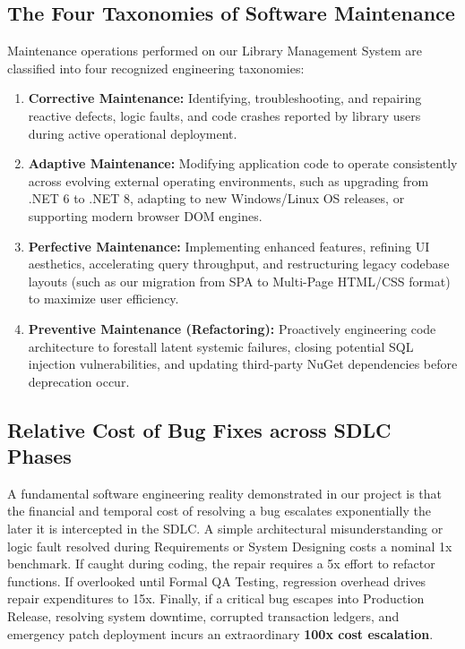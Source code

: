 \documentclass[10pt,journal,compsoc]{IEEEtran}
\begin{document}
\subsection{The Four Taxonomies of Software Maintenance}
Maintenance operations performed on our Library Management System are classified into four recognized engineering taxonomies:
\begin{enumerate}[leftmargin=1.5em]
    \item \textbf{Corrective Maintenance:} Identifying, troubleshooting, and repairing reactive defects, logic faults, and code crashes reported by library users during active operational deployment.
    \item \textbf{Adaptive Maintenance:} Modifying application code to operate consistently across evolving external operating environments, such as upgrading from .NET 6 to .NET 8, adapting to new Windows/Linux OS releases, or supporting modern browser DOM engines.
    \item \textbf{Perfective Maintenance:} Implementing enhanced features, refining UI aesthetics, accelerating query throughput, and restructuring legacy codebase layouts (such as our migration from SPA to Multi-Page HTML/CSS format) to maximize user efficiency.
    \item \textbf{Preventive Maintenance (Refactoring):} Proactively engineering code architecture to forestall latent systemic failures, closing potential SQL injection vulnerabilities, and updating third-party NuGet dependencies before deprecation occur.
\end{enumerate}

\subsection{Relative Cost of Bug Fixes across SDLC Phases}
A fundamental software engineering reality demonstrated in our project is that the financial and temporal cost of resolving a bug escalates exponentially the later it is intercepted in the SDLC. A simple architectural misunderstanding or logic fault resolved during Requirements or System Designing costs a nominal 1x benchmark. If caught during coding, the repair requires a 5x effort to refactor functions. If overlooked until Formal QA Testing, regression overhead drives repair expenditures to 15x. Finally, if a critical bug escapes into Production Release, resolving system downtime, corrupted transaction ledgers, and emergency patch deployment incurs an extraordinary \textbf{100x cost escalation}.
\end{document}
